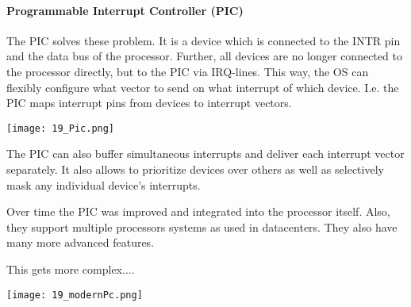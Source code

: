 \paragraph{Programmable Interrupt Controller (PIC)}
The PIC solves these problem. It is a device which is connected to the INTR pin and the data bus of the processor. Further, all devices are no longer connected to the processor directly, but to the PIC via IRQ-lines. This way, the OS can flexibly configure what vector to send on what interrupt of which device. I.e. the PIC maps interrupt pins from devices to interrupt vectors.

\texttt{[image: 19\_Pic.png]}

The PIC can also buffer simultaneous interrupts and deliver each interrupt vector separately. It also allows to prioritize devices over others as well as selectively mask any individual device's interrupts.

Over time the PIC was improved and integrated into the processor itself. Also, they support multiple processors systems as used in datacenters. They also have many more advanced features. 

This gets more complex....

\texttt{[image: 19\_modernPc.png]}
